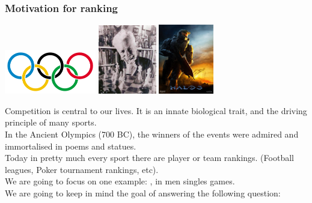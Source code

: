 \begin{frame}
\frametitle{Motivation for ranking}

\centerline{
\includegraphics[width=0.3\textwidth]{OlympicRings}\hspace{1cm}
\includegraphics[width=0.19\textwidth]{ArpadElo}\hspace{1cm}
\includegraphics[width=0.18\textwidth]{Halo3}
}

Competition is central to our lives. It is an innate biological trait,
and the driving principle of many sports.\\[1ex]

In the Ancient Olympics (700 BC), the winners of the events were
admired and immortalised in poems and statues.\\[1ex]

Today in pretty much every sport there are player or team
rankings. (Football leagues, Poker tournament rankings, etc).\\[1ex]

We are going to focus on one example: ,
in men singles games.\\[1ex]

We are going to keep in mind the goal of answering the following question:\\
\end{frame}


